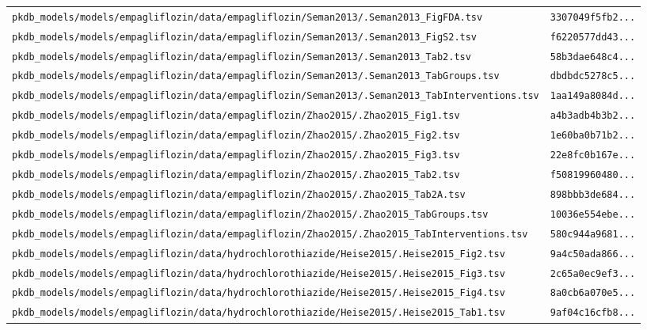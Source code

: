 \begin{longtable}{ll}
\texttt{pkdb\_models/models/empagliflozin/data/empagliflozin/Seman2013/.Seman2013\_FigFDA.tsv} & \texttt{3307049f5fb2...} \\
\texttt{pkdb\_models/models/empagliflozin/data/empagliflozin/Seman2013/.Seman2013\_FigS2.tsv} & \texttt{f6220577dd43...} \\
\texttt{pkdb\_models/models/empagliflozin/data/empagliflozin/Seman2013/.Seman2013\_Tab2.tsv} & \texttt{58b3dae648c4...} \\
\texttt{pkdb\_models/models/empagliflozin/data/empagliflozin/Seman2013/.Seman2013\_TabGroups.tsv} & \texttt{dbdbdc5278c5...} \\
\texttt{pkdb\_models/models/empagliflozin/data/empagliflozin/Seman2013/.Seman2013\_TabInterventions.tsv} & \texttt{1aa149a8084d...} \\
\texttt{pkdb\_models/models/empagliflozin/data/empagliflozin/Zhao2015/.Zhao2015\_Fig1.tsv} & \texttt{a4b3adb4b3b2...} \\
\texttt{pkdb\_models/models/empagliflozin/data/empagliflozin/Zhao2015/.Zhao2015\_Fig2.tsv} & \texttt{1e60ba0b71b2...} \\
\texttt{pkdb\_models/models/empagliflozin/data/empagliflozin/Zhao2015/.Zhao2015\_Fig3.tsv} & \texttt{22e8fc0b167e...} \\
\texttt{pkdb\_models/models/empagliflozin/data/empagliflozin/Zhao2015/.Zhao2015\_Tab2.tsv} & \texttt{f50819960480...} \\
\texttt{pkdb\_models/models/empagliflozin/data/empagliflozin/Zhao2015/.Zhao2015\_Tab2A.tsv} & \texttt{898bbb3de684...} \\
\texttt{pkdb\_models/models/empagliflozin/data/empagliflozin/Zhao2015/.Zhao2015\_TabGroups.tsv} & \texttt{10036e554ebe...} \\
\texttt{pkdb\_models/models/empagliflozin/data/empagliflozin/Zhao2015/.Zhao2015\_TabInterventions.tsv} & \texttt{580c944a9681...} \\
\texttt{pkdb\_models/models/empagliflozin/data/hydrochlorothiazide/Heise2015/.Heise2015\_Fig2.tsv} & \texttt{9a4c50ada866...} \\
\texttt{pkdb\_models/models/empagliflozin/data/hydrochlorothiazide/Heise2015/.Heise2015\_Fig3.tsv} & \texttt{2c65a0ec9ef3...} \\
\texttt{pkdb\_models/models/empagliflozin/data/hydrochlorothiazide/Heise2015/.Heise2015\_Fig4.tsv} & \texttt{8a0cb6a070e5...} \\
\texttt{pkdb\_models/models/empagliflozin/data/hydrochlorothiazide/Heise2015/.Heise2015\_Tab1.tsv} & \texttt{9af04c16cfb8...} \\

\end{longtable}
